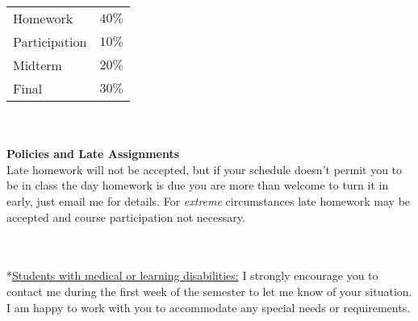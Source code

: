 \documentclass[11pt]{article}
\begin{document}
\begin{tabular}{ll}
Homework & $40 \%$\\
Participation & $10 \%$\\
Midterm & $20 \%$\\
Final & $30 \%$
\end{tabular} 
\ \\
 \ \\
 
 {\bf Policies and Late Assignments}\\
 Late homework will not be accepted, but if your schedule doesn't permit you to be in class the day homework is due you are more than welcome to turn it in early, just email me for details. For \textit{extreme} circumstances late homework may be accepted and course participation not necessary. 
 
  \ \\
 \ \\
 *\underline{Students with medical or learning disabilities:} I strongly encourage you to contact me during the first
week of the semester to let me know of your situation. I am happy to work with you to accommodate any
special needs or requirements.
 \ \\
 \ \\
 
\end{document}
